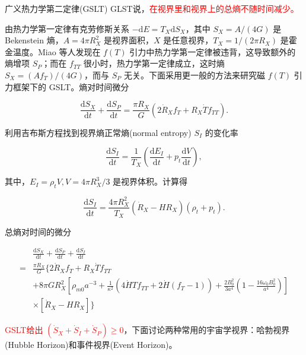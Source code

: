 \documentclass[9pt, dvipsnames]{beamer} %
\begin{document}
\begin{frame}{广义热力学第二定律(GSLT)}
    GLST说，\textcolor{red}{在视界里和视界上的总熵不随时间减少。}

    由热力学第一定律有克劳修斯关系 $-\mathrm{d}E=T_X\mathrm{d}S_X$，其中 $S_X=A/(4G)$ 是 Bekenstein 熵，$A=4\pi R_X^2$ 是视界面积，$X$ 是任意视界，$T_X=1/(2\pi R_X)$ 是霍金温度。Miao 等人发现在 $f(T)$ 引力中热力学第一定律被违背，这导致额外的熵增项 $S_P$；而在 $f_{TT}$ 很小时，热力学第一定律成立，这时熵 $S_X=(Af_T)/(4G)$，而与 $S_P$ 无关。下面采用更一般的方法来研究磁 $f(T)$ 引力框架下的 GSLT。熵对时间微分

    $$
    \frac{\mathrm{d}S_X }{\mathrm{d}t } + \frac{\mathrm{d}S_P }{\mathrm{d}t } = \frac{\pi R_X }{G } \left(2\dot{R}_X f_T + R_X\dot{T} f_{TT} \right).
    $$

    利用吉布斯方程找到视界熵正常熵(normal entropy) $S_I$ 的变化率

    $$
    \frac{\mathrm{d}S_I }{\mathrm{d}t } 
    =\frac{1 }{T_X } \left(\frac{\mathrm{d}E_I }{\mathrm{d}t } + p_t\frac{\mathrm{d}V }{\mathrm{d}t }  \right),
    $$

    其中，$E_I=\rho_t V,V=4\pi R_X^3/3$ 是视界体积。计算得

    $$
    \frac{\mathrm{d}S_I }{\mathrm{d}t } 
    =\frac{4\pi R_X^2 }{T_X } \left(\dot{R}_X - H R_X \right)\left(\rho_t+p_t \right).
    $$
    
\end{frame}

\begin{frame}
    总熵对时间的微分

    $$
    \begin{aligned}
        &\frac{\mathrm{d}S_X }{\mathrm{d}t } + \frac{\mathrm{d}S_P }{\mathrm{d}t } + \frac{\mathrm{d}S_I }{\mathrm{d}t } \\
        =&\frac{\pi R_X }{G } \bigg\{2\dot{R}_X f_T + R_X\dot{T}f_{TT} \\
        &+ 8\pi G R_X^2 \left[\rho_{m0}a^{-3} + \frac{1 }{\kappa^2 } \left(4\dot{H} T f_{TT} + 2\dot{H}\left(f_T-1 \right) \right) + \frac{2B_0^2 }{3a^4 } \left(1-\frac{16\omega_0 B_0^2 }{a^4 }  \right) \right] \\
        &\times \left[\dot{R}_X - H R_X \right] \bigg\}
    \end{aligned}
    $$

    \textcolor{red}{GSLT给出 $(\dot{S}_X+\dot{S}_I+\dot{S}_P)\geqslant 0$}，下面讨论两种常用的宇宙学视界：哈勃视界(Hubble Horizon)和事件视界(Event Horizon)。

\end{frame}
\end{document}
